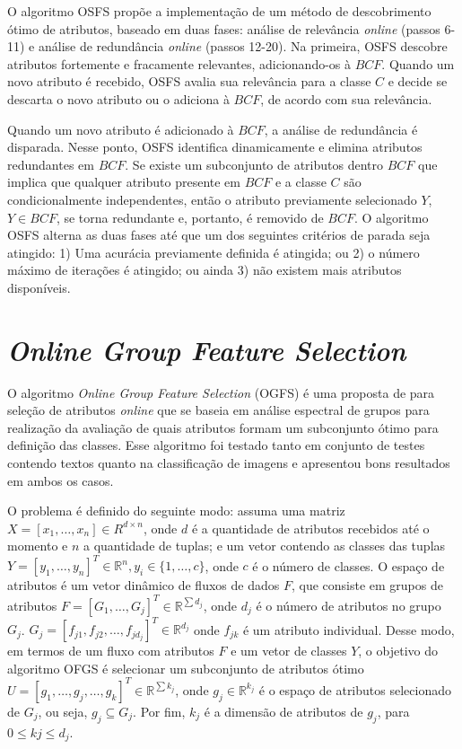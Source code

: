 \bigskip

O algoritmo OSFS propõe a implementação de um método de descobrimento ótimo de atributos, baseado em duas fases: análise de relevância \textit{online} (passos 6-11) e análise de redundância \textit{online} (passos 12-20). Na primeira, OSFS descobre atributos fortemente e fracamente relevantes, adicionando-os à $BCF$. Quando um novo atributo é recebido, OSFS avalia sua relevância para a classe $C$ e decide se descarta o novo atributo ou o adiciona à $BCF$, de acordo com sua relevância.

Quando um novo atributo é adicionado à $BCF$, a análise de redundância é disparada. Nesse ponto, OSFS identifica dinamicamente e elimina atributos redundantes em $BCF$. Se existe um subconjunto de atributos dentro $BCF$ que implica que qualquer atributo presente em $BCF$ e a classe $C$ são condicionalmente independentes, então o atributo previamente selecionado $Y$, $Y \in BCF$, se torna redundante e, portanto, é removido de $BCF$. O algoritmo OSFS alterna as duas fases até que um dos seguintes critérios de parada seja atingido: 1) Uma acurácia previamente definida é atingida; ou 2) o número máximo de iterações é atingido; ou ainda 3) não existem mais atributos disponíveis.

\section{\textit{Online Group Feature Selection}}\label{sec:ogfs} 

O algoritmo \textit{Online Group Feature Selection} (OGFS) 
é uma proposta de  para seleção de atributos \textit{online} que se baseia em análise espectral de grupos para realização da avaliação de quais atributos formam um subconjunto ótimo para definição das classes. Esse algoritmo foi testado tanto em conjunto de testes contendo textos quanto na classificação de imagens e apresentou bons resultados em ambos os casos.


O problema é definido do seguinte modo: assuma uma matriz $X = [x_1, \dots, x_n] \in R^{d\times n}$, onde $d$ é a quantidade de atributos recebidos até o momento e $n$ a quantidade de tuplas; e um vetor contendo as classes das tuplas $Y=[y_1, \dots, y_n]^{T} \in \mathbb{R}^{n},y_i \in \{1, \dots, c\}$, onde $c$ é o número de classes. O espaço de atributos é um vetor dinâmico de fluxos de dados $F$, que consiste em grupos de atributos $F = [G_1, \dots, G_j]^{T} \in \mathbb{R}^{\sum d_j}$, onde $d_j$ é o número de atributos no grupo $G_j$. $G_j = [f_{j1}, f_{j2}, \dots, f_{jd_j}]^{T} \in  \mathbb{R}^{d_j}$ onde $f_{jk}$ é um atributo individual. Desse modo, em termos de um fluxo com atributos $F$ e um vetor de classes $Y$, o objetivo do algoritmo OFGS é selecionar um subconjunto de atributos ótimo $U = [g_1, \dots, g_j, \dots, g_k]^{T} \in \mathbb{R}^{\sum k_j}$, onde $g_j \in \mathbb{R}^{k_j}$ é o espaço de atributos selecionado de $G_j$, ou seja, $g_j \subseteq G_j$. Por fim, $k_j$ é a dimensão de atributos de $g_j$, para $0 \leq kj \leq d_j$. 

